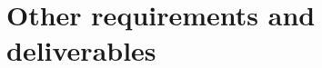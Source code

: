\documentclass[Main]{subfiles}
\begin{document}
\chapter{Other requirements and deliverables}

%
%

%

\end{document}
